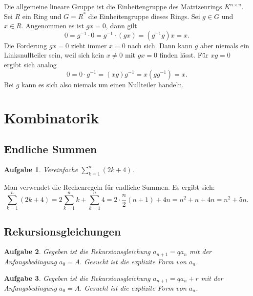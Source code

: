 \documentclass[a4paper,10pt,fleqn,twoside]{scrartcl}
\numberwithin{equation}{section}
\newcommand{\strong}[1]{{\normalfont\sffamily\bfseries #1}}
\theoremstyle{Aufgabe}
\newtheorem{Aufgabe}{\sffamily Aufgabe}[section]
\begin{document}
Die allgemeine lineare Gruppe ist die Einheitengruppe des Matrizenrings
$K^{n\times n}$. Sei $R$ ein Ring und $G=R^*$ die Einheitengruppe
dieses Rings. Sei $g\in G$ und $x\in R$. Angenommen es ist $gx=0$,
dann gilt%
\begin{equation}
0 = g^{-1}\cdot 0 = g^{-1}\cdot (gx) = (g^{-1}g)x = x.
\end{equation}
Die Forderung $gx=0$ zieht immer $x=0$ nach sich. Dann kann $g$ aber
niemals ein Linksnullteiler sein, weil sich kein $x\ne 0$ mit $gx=0$
finden lässt. Für $xg=0$ ergibt sich analog%
\begin{equation}
0 = 0\cdot g^{-1} = (xg)g^{-1} = x(gg^{-1}) = x.
\end{equation}
Bei $g$ kann es sich also niemals um einen Nullteiler handeln.

\newpage
\section{Kombinatorik}
\subsection{Endliche Summen}
\begin{Aufgabe}
Vereinfache $\displaystyle\sum_{k=1}^n (2k+4)$.
\end{Aufgabe}

\noindent\strong{Lösung.}
Man verwendet die Rechenregeln für endliche Summen.
Es ergibt sich:
\begin{equation}
\sum_{k=1}^n (2k+4) = 2\sum_{k=1}^n k + \sum_{k=1}^n 4
= 2\cdot\frac{n}{2}(n+1)+4n = n^2+n+4n = n^2+5n.
\end{equation}

\subsection{Rekursionsgleichungen}

\begin{Aufgabe}\label{qPotenzen}
Gegeben ist die Rekursionsgleichung $a_{n+1} = qa_n$
mit der Anfangsbedingung $a_0=A.$
Gesucht ist die explizite Form von $a_n$.
\end{Aufgabe}

\begin{Aufgabe}
Gegeben ist die Rekursionsgleichung
$a_{n+1} = qa_n+r$
mit der Anfangsbedingung
$a_0=A.$
Gesucht ist die explizite Form von $a_n$.
\end{Aufgabe}
\end{document}
